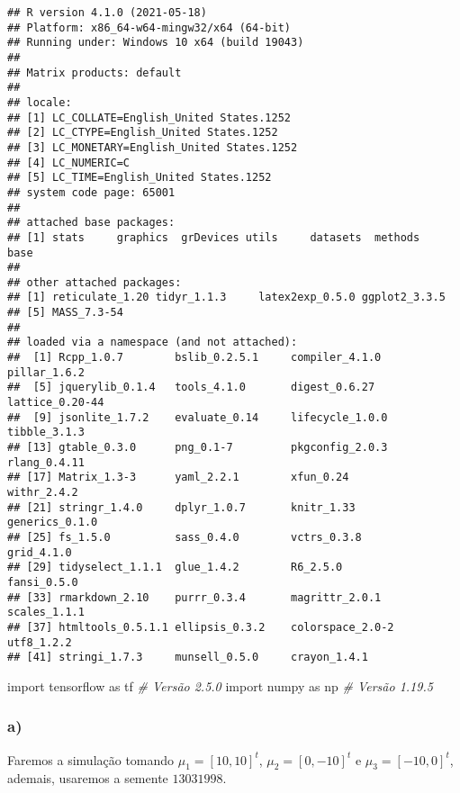 \documentclass[
]{article}
\newenvironment{Shaded}{\begin{snugshade}}{\end{snugshade}}
\newcommand{\CommentTok}[1]{\textcolor[rgb]{0.56,0.35,0.01}{\textit{#1}}}
\newcommand{\ImportTok}[1]{#1}
\newcommand{\NormalTok}[1]{#1}
\begin{document}
\begin{verbatim}
## R version 4.1.0 (2021-05-18)
## Platform: x86_64-w64-mingw32/x64 (64-bit)
## Running under: Windows 10 x64 (build 19043)
## 
## Matrix products: default
## 
## locale:
## [1] LC_COLLATE=English_United States.1252 
## [2] LC_CTYPE=English_United States.1252   
## [3] LC_MONETARY=English_United States.1252
## [4] LC_NUMERIC=C                          
## [5] LC_TIME=English_United States.1252    
## system code page: 65001
## 
## attached base packages:
## [1] stats     graphics  grDevices utils     datasets  methods   base     
## 
## other attached packages:
## [1] reticulate_1.20 tidyr_1.1.3     latex2exp_0.5.0 ggplot2_3.3.5  
## [5] MASS_7.3-54    
## 
## loaded via a namespace (and not attached):
##  [1] Rcpp_1.0.7        bslib_0.2.5.1     compiler_4.1.0    pillar_1.6.2     
##  [5] jquerylib_0.1.4   tools_4.1.0       digest_0.6.27     lattice_0.20-44  
##  [9] jsonlite_1.7.2    evaluate_0.14     lifecycle_1.0.0   tibble_3.1.3     
## [13] gtable_0.3.0      png_0.1-7         pkgconfig_2.0.3   rlang_0.4.11     
## [17] Matrix_1.3-3      yaml_2.2.1        xfun_0.24         withr_2.4.2      
## [21] stringr_1.4.0     dplyr_1.0.7       knitr_1.33        generics_0.1.0   
## [25] fs_1.5.0          sass_0.4.0        vctrs_0.3.8       grid_4.1.0       
## [29] tidyselect_1.1.1  glue_1.4.2        R6_2.5.0          fansi_0.5.0      
## [33] rmarkdown_2.10    purrr_0.3.4       magrittr_2.0.1    scales_1.1.1     
## [37] htmltools_0.5.1.1 ellipsis_0.3.2    colorspace_2.0-2  utf8_1.2.2       
## [41] stringi_1.7.3     munsell_0.5.0     crayon_1.4.1
\end{verbatim}

\begin{Shaded}
\begin{Highlighting}[]
\ImportTok{import}\NormalTok{ tensorflow }\ImportTok{as}\NormalTok{ tf }\CommentTok{\# Versão 2.5.0}
\ImportTok{import}\NormalTok{ numpy }\ImportTok{as}\NormalTok{ np      }\CommentTok{\# Versão 1.19.5}
\end{Highlighting}
\end{Shaded}

\hypertarget{a-2}{%
\subsubsection{a)}\label{a-2}}

Faremos a simulação tomando \(\mu_1=[10,10]^t\), \(\mu_2=[0,-10]^t\) e
\(\mu_3=[-10,0]^t\), ademais, usaremos a semente \(13031998\).
\end{document}
